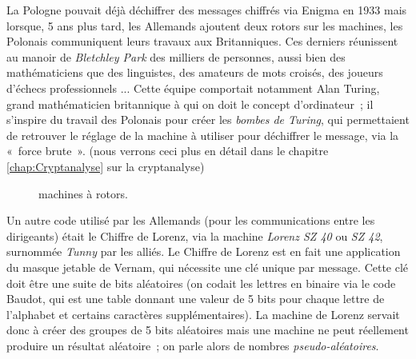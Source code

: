 La Pologne pouvait déjà déchiffrer des messages chiffrés via Enigma en
1933 mais lorsque, 5 ans plus tard, les Allemands ajoutent deux rotors
sur les machines, les Polonais communiquent leurs travaux aux
Britanniques. Ces derniers réunissent au manoir de \emph{Bletchley
Park} des milliers de
personnes, aussi bien des mathématiciens que des linguistes, des
amateurs de mots croisés, des joueurs d'échecs professionnels ...
Cette équipe comportait notamment Alan Turing, grand mathématicien
britannique à qui on doit le concept d'ordinateur~; il s'inspire du
travail des Polonais pour créer les \emph{bombes de Turing}, qui
permettaient de retrouver le réglage de la machine à utiliser pour
déchiffrer le message, via la «~force brute~». (nous verrons ceci plus
en détail dans le chapitre \ref{chap:Cryptanalyse} sur la
cryptanalyse) \\

\begin{figure}[h]
  \begin{center}
    \hspace{1.5cm}
  \end{center}
  \vspace{-10pt}
  \caption{machines à rotors.}
  \vspace{-10pt}
\end{figure}


Un autre code utilisé par les Allemands (pour les communications entre
les dirigeants) était le Chiffre de Lorenz, via la machine
\emph{Lorenz SZ 40} ou \emph{SZ 42}, surnommée \emph{Tunny} par les alliés. Le
Chiffre de Lorenz est en fait une application du masque jetable de
Vernam, qui nécessite une clé unique par message. Cette clé doit
être une suite de bits aléatoires (on codait les lettres en binaire
via le code Baudot, qui est une table donnant une valeur de 5 bits
pour chaque lettre de l'alphabet et certains caractères
supplémentaires). La machine de Lorenz servait donc à créer des
groupes de 5 bits aléatoires mais une machine ne peut réellement
produire un résultat aléatoire~; on parle alors de nombres
\emph{pseudo-aléatoires}.

